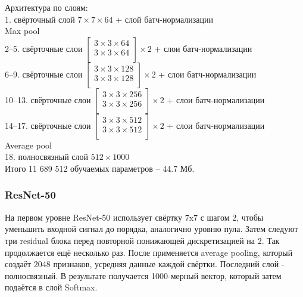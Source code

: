 Архитектура по слоям:\\
1. свёрточный слой $7\times7\times64$ + слой батч-нормализации\\
Max pool\\
2--5. свёрточные слои $\begin{bmatrix}
3\times3\times64\\
3\times3\times64\\
\end{bmatrix} \times2$ + слои батч-нормализации\\
6--9. свёрточные слои $\begin{bmatrix}
3\times3\times128\\
3\times3\times128\\
\end{bmatrix} \times2$ + слои батч-нормализации\\
10--13. свёрточные слои $\begin{bmatrix}
3\times3\times256\\
3\times3\times256\\
\end{bmatrix} \times2$ + слои батч-нормализации\\
14--17. свёрточные слои $\begin{bmatrix}
3\times3\times512\\
3\times3\times512\\
\end{bmatrix} \times2$ + слои батч-нормализации\\
Average pool\\
18. полносвязный слой $512\times1000$\\

Итого 11 689 512 обучаемых параметров -- 44.7 Мб.

\subsubsection{ResNet-50}
На первом уровне ResNet-50 использует свёртку 7x7 с шагом 2, чтобы уменьшить входной сигнал до порядка, аналогично уровню пула. Затем следуют три residual блока перед повторной понижающей дискретизацией на 2. Так продолжается ещё несколько раз. После применяется average pooling, который создаёт 2048 признаков, усредняя данные каждой свёртки. Последний слой - полносвязный. В результате получается 1000-мерный вектор, который затем подаётся в слой Softmax.
\\

